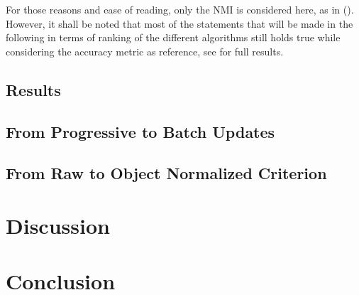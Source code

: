 \documentclass[a4paper,twoside]{article}
\begin{document}
For those reasons and ease of reading, only the NMI is considered here, as in (\cite{Kulis2008}). However, it shall be noted that most of the statements that will be made in the following in terms of ranking of the different algorithms  still holds true while considering the accuracy metric as reference, see \url{} for full results.

\subsection{Results}





\subsection{From Progressive to Batch Updates}

\subsection{From Raw to Object Normalized Criterion}


\section{Discussion}

\section{Conclusion}



\appendix


\end{document}
